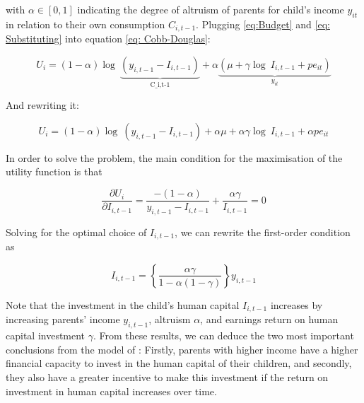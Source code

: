 \documentclass[a4paper, 12pt]{article}
\begin{document}
with $\alpha \in [0,1]$ indicating the degree of altruism of parents for child's income $y_{it}$ in relation to their own consumption $C_{i,t-1}$. Plugging \eqref{eq:Budget} and \eqref{eq: Substituting} into equation \eqref{eq: Cobb-Douglas}:

\begin{equation} \label{eq: rewritten0} 
U_i = (1 - \alpha) \log \ \underbrace{(y_{i,t-1}-I_{i,t-1})}_{\text{C_{i,t-1}}} + \alpha \underbrace{(\mu + \gamma \log \ I_{i,t-1} + pe_{it})}_{y_{it}}
\end{equation}

And rewriting it:

\begin{equation} \label{eq: rewritten} 
U_i = (1 - \alpha) \log \ (y_{i,t-1}-I_{i,t-1})+ \alpha \mu + \alpha \gamma \log \ I_{i,t-1} + \alpha pe_{it}
\end{equation}

In order to solve the problem, the main condition for the maximisation of the utility function is that 

\begin{equation} \label{eq: First-order} 
\frac{\partial U_i}{\partial I_{i,t-1}} = \frac{-(1-\alpha)}{y_{i,t-1}-I_{i,t-1}} + \frac{\alpha \gamma}{I_{i,t-1}}=0
\end{equation}

Solving for the optimal choice of $I_{i,t-1}$, we can rewrite the first-order condition as 


\begin{equation} \label{eq: Optimal-choice} 
I_{i,t-1} = \left \{ \frac{\alpha \gamma}{1 - \alpha (1 - \gamma)} \right \} y_{i,t-1}
\end{equation}

Note that the investment in the child's human capital $I_{i,t-1}$ increases by increasing parents’ income $y_{i,t-1}$, altruism $\alpha$, and earnings return on human capital investment $\gamma$. From these results, we can deduce the two most important conclusions from the model of \citet{Solon2004}: Firstly, parents with higher income have a higher financial capacity to invest in the human capital of their children, and secondly, they also have a greater incentive to make this investment if the return on investment in human capital increases over time.




\vspace{0.5cm}

\setcounter{equation}{0}
\end{document}
